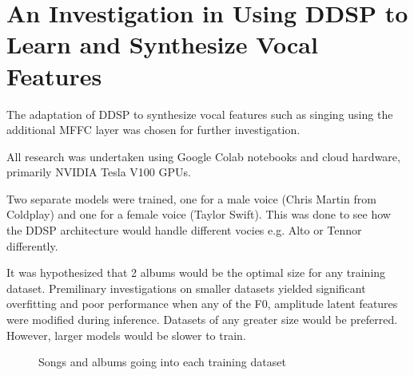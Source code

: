 \chapter{An Investigation in Using DDSP to Learn and Synthesize Vocal Features}

The adaptation of DDSP to synthesize vocal features such as singing using the additional MFFC layer was chosen for further investigation.

All research was undertaken using Google Colab notebooks and cloud hardware, primarily NVIDIA Tesla V100 GPUs.

Two separate models were trained, one for a male voice (Chris Martin from Coldplay) and one for a female voice (Taylor Swift). This was done to see how the DDSP architecture would handle different vocies e.g. Alto or Tennor differently.

It was hypothesized that 2 albums would be the optimal size for any training dataset. Premilinary investigations on smaller datasets yielded significant overfitting and poor performance when any of the F0, amplitude latent features were modified during inference. Datasets of any greater size would be preferred. However, larger models would be slower to train.

\begin{figure}
    \centering
    \caption{Songs and albums going into each training dataset}
\end{figure}





